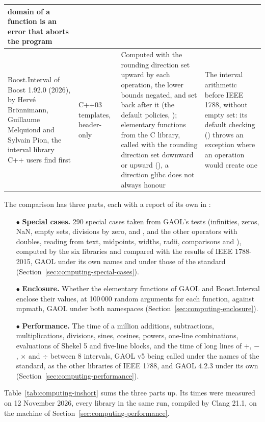 \begin{longtable}{|L{2.5cm}|L{1.9cm}|L{4.7cm}|L{4.0cm}|}
domain of a function is an error that aborts the program \\
\hline
Boost.Interval of Boost 1.92.0 (2026), by Herv\'e Br\"onnimann, Guillaume
Melquiond and Sylvain Pion, the interval library C++ users find first &
C++03 templates, header-only & Computed with the rounding direction set
upward by each operation, the lower bounds negated, and set back after it
(the default policies,
\allowbreak{}); elementary
functions from the C library, called with the rounding direction set
downward or upward (), a direction glibc does not
always honour & The interval arithmetic before IEEE 1788, without empty set:
its default checking () throws an exception where an
operation would create one \\
\hline
\end{longtable}
\endgroup

The comparison has three parts, each with a report of its own in
:
\begin{itemize}
\item[$\bullet$] \textbf{Special cases.} 290 special cases taken from
GAOL's tests (infinities, zeros, NaN, empty sets, divisions by zero,
 and , \code{+=} and the other operators with doubles,
reading from text, midpoints, widths, radii, comparisons and ),
computed by the six libraries and compared with the results of IEEE
1788-2015, GAOL under its own names and under those of the standard
(Section~\ref{sec:computing-special-cases}).
\item[$\bullet$] \textbf{Enclosure.} Whether the elementary functions of
GAOL and Boost.Interval enclose their values, at 100\,000 random arguments
for each function, against mpmath, GAOL under both namespaces
(Section~\ref{sec:computing-enclosure}).
\item[$\bullet$] \textbf{Performance.} The time of a million additions,
subtractions, multiplications, divisions, sines, cosines, powers, one-line
combinations, evaluations of Shekel 5 and five-line blocks, and the time of
long lines of $+$, $-$, $\times$ and $\div$ between 8 intervals, GAOL v5
being called under the names of the standard, as the other libraries of IEEE
1788, and GAOL 4.2.3 under its own
(Section~\ref{sec:computing-performance}).
\end{itemize}

\medskip
\noindent Table~\ref{tab:computing-inshort} sums the three parts up. Its
times were measured on 12 November 2026, every library in the same run,
compiled by Clang 21.1, on the machine of
Section~\ref{sec:computing-performance}.

